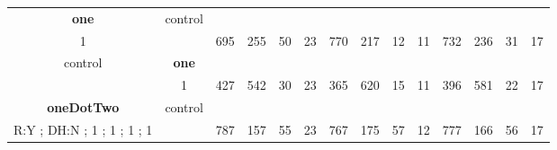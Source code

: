 \begin{table}[]
{\begin{tabular}{|c|c|c|c|c|c|c|c|c|c|c|c|c|c|}
\cellcolor{blue!15}\textbf{one} & control& {\color[HTML]{00009B} } & {\color[HTML]{9A0000} } & {\color[HTML]{009901} } &  & {\color[HTML]{00009B} } & {\color[HTML]{9A0000} } & {\color[HTML]{009901} } &  & {\color[HTML]{00009B} } & {\color[HTML]{9A0000} } & {\color[HTML]{009901} } &  \\ 
\cellcolor{ blue!15}1 &  & \multirow{-2}{*}{{\color[HTML]{00009B} 695}} & \multirow{-2}{*}{{\color[HTML]{9A0000} 255}} & \multirow{-2}{*}{{\color[HTML]{009901} 50}} & \multirow{-2}{*}{23} & \multirow{-2}{*}{{\color[HTML]{00009B} 770}} & \multirow{-2}{*}{{\color[HTML]{9A0000} 217}} & \multirow{-2}{*}{{\color[HTML]{009901} 12}} & \multirow{-2}{*}{11} & \multirow{-2}{*}{{\color[HTML]{00009B} 732}} & \multirow{-2}{*}{{\color[HTML]{9A0000} 236}} & \multirow{-2}{*}{{\color[HTML]{009901} 31}} & \multirow{-2}{*}{17} \\ \hline

control & \cellcolor{blue!15}\textbf{one}& {\color[HTML]{00009B} } & {\color[HTML]{9A0000} } & {\color[HTML]{009901} } &  & {\color[HTML]{00009B} } & {\color[HTML]{9A0000} } & {\color[HTML]{009901} } &  & {\color[HTML]{00009B} } & {\color[HTML]{9A0000} } & {\color[HTML]{009901} } &  \\ 
 & \cellcolor{ blue!15}1 & \multirow{-2}{*}{{\color[HTML]{00009B} 427}} & \multirow{-2}{*}{{\color[HTML]{9A0000} 542}} & \multirow{-2}{*}{{\color[HTML]{009901} 30}} & \multirow{-2}{*}{23} & \multirow{-2}{*}{{\color[HTML]{00009B} 365}} & \multirow{-2}{*}{{\color[HTML]{9A0000} 620}} & \multirow{-2}{*}{{\color[HTML]{009901} 15}} & \multirow{-2}{*}{11} & \multirow{-2}{*}{{\color[HTML]{00009B} 396}} & \multirow{-2}{*}{{\color[HTML]{9A0000} 581}} & \multirow{-2}{*}{{\color[HTML]{009901} 22}} & \multirow{-2}{*}{17} \\ \hline


\cellcolor{blue!15}\textbf{oneDotTwo} & control& {\color[HTML]{00009B} } & {\color[HTML]{9A0000} } & {\color[HTML]{009901} } &  & {\color[HTML]{00009B} } & {\color[HTML]{9A0000} } & {\color[HTML]{009901} } &  & {\color[HTML]{00009B} } & {\color[HTML]{9A0000} } & {\color[HTML]{009901} } &  \\ 
\cellcolor{ blue!15}R:Y ; DH:N ; 1 ; 1 ; 1 ; 1 &  & \multirow{-2}{*}{{\color[HTML]{00009B} 787}} & \multirow{-2}{*}{{\color[HTML]{9A0000} 157}} & \multirow{-2}{*}{{\color[HTML]{009901} 55}} & \multirow{-2}{*}{23} & \multirow{-2}{*}{{\color[HTML]{00009B} 767}} & \multirow{-2}{*}{{\color[HTML]{9A0000} 175}} & \multirow{-2}{*}{{\color[HTML]{009901} 57}} & \multirow{-2}{*}{12} & \multirow{-2}{*}{{\color[HTML]{00009B} 777}} & \multirow{-2}{*}{{\color[HTML]{9A0000} 166}} & \multirow{-2}{*}{{\color[HTML]{009901} 56}} & \multirow{-2}{*}{17} \\ \hline


\end{tabular}}
\end{table}
